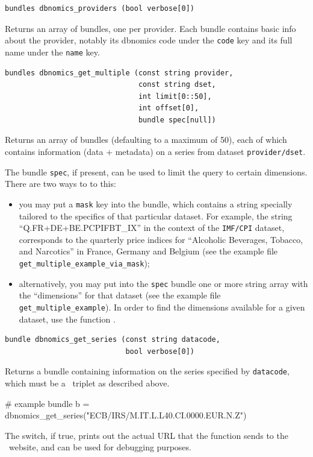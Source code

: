\documentclass{article}
\begin{document}
\begin{funcdoc}
\begin{verbatim}
bundles dbnomics_providers (bool verbose[0])
\end{verbatim}
Returns an array of bundles, one per provider. Each bundle contains
basic info about the provider, notably its dbnomics code under the
\texttt{code} key and its full name under the \texttt{name} key.
\end{funcdoc}

\begin{funcdoc}
\begin{verbatim}
bundles dbnomics_get_multiple (const string provider,
                               const string dset,
                               int limit[0::50],
                               int offset[0],
                               bundle spec[null])
\end{verbatim}
  Returns an array of bundles (defaulting to a maximum of 50), each of
  which contains information (data + metadata) on a series from
  dataset \texttt{provider/dset}.

  The bundle \texttt{spec}, if present, can be used to limit the query
  to certain dimensions. There are two ways to to this:
  \begin{itemize}
  \item you may put a \texttt{mask} key into the bundle, which
    contains a string specially tailored to the specifics of that
    particular dataset. For example, the string
    ``Q.FR+DE+BE.PCPIFBT\_IX'' in the context of the \texttt{IMF/CPI}
    dataset, corresponds to the quarterly price indices for
    ``Alcoholic Beverages, Tobacco, and Narcotics'' in France, Germany
    and Belgium (see the example file
    \texttt{get\_multiple\_example\_via\_mask});
  \item alternatively, you may put into the \texttt{spec} bundle one
    or more string array with the ``dimensions'' for that dataset (see
    the example file \texttt{get\_multiple\_example}).  In order to
    find the dimensions available for a given dataset, use the
    function .
  \end{itemize}

\end{funcdoc}

\begin{funcdoc}
\begin{verbatim}
bundle dbnomics_get_series (const string datacode,
                            bool verbose[0])
\end{verbatim}
Returns a bundle containing information on the series specified by
\texttt{datacode}, which must be a \DB\ triplet as
described above.
\begin{code}
# example
bundle b = dbnomics_get_series("ECB/IRS/M.IT.L.L40.CI.0000.EUR.N.Z")
\end{code}
The  switch, if true, prints out the actual URL that the
function sends to the \DB\ website, and can be used for debugging purposes.
\end{funcdoc}
\end{document}
